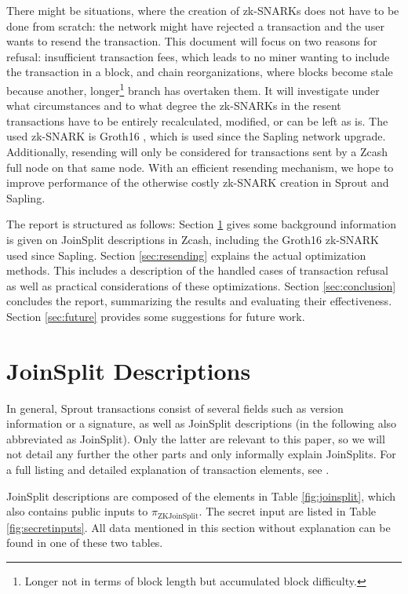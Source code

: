 \documentclass{article}
\begin{document}
There might be situations, where the creation of zk-SNARKs does not have to be done from scratch: the network might have rejected a transaction and the user wants to resend the transaction.
This document will focus on two reasons for refusal: insufficient transaction fees, which leads to no miner wanting to include the transaction in a block, and chain reorganizations, where blocks become stale because another, longer\footnote{Longer not in terms of block length but accumulated block difficulty.} branch has overtaken them.
It will investigate under what circumstances and to what degree the zk-SNARKs in the resent transactions have to be entirely recalculated, modified, or can be left as is.
The used zk-SNARK is Groth16 \cite{groth:zksnark}, which is used since the Sapling network upgrade.
Additionally, resending will only be considered for transactions sent by a Zcash full node on that same node.
With an efficient resending mechanism, we hope to improve performance of the otherwise costly zk-SNARK creation in Sprout and Sapling.

The report is structured as follows: Section \ref{sec:joinsplit} gives some background information is given on JoinSplit descriptions in Zcash, including the Groth16 zk-SNARK used since Sapling.
Section \ref{sec:resending} explains the actual optimization methods.
This includes a description of the handled cases of transaction refusal as well as practical considerations of these optimizations.
Section \ref{sec:conclusion} concludes the report, summarizing the results and evaluating their effectiveness.
Section \ref{sec:future} provides some suggestions for future work.

\section{JoinSplit Descriptions} \label{sec:joinsplit}

In general, Sprout transactions consist of several fields such as version information or a signature, as well as JoinSplit descriptions (in the following also abbreviated as JoinSplit).
Only the latter are relevant to this paper, so we will not detail any further the other parts and only informally explain JoinSplits.
For a full listing and detailed explanation of transaction elements, see \cite{hopwood:zcash}.

JoinSplit descriptions are composed of the elements in Table \ref{fig:joinsplit}, which also contains public inputs to $\pi_\text{ZKJoinSplit}$.
The secret input are listed in Table \ref{fig:secretinputs}.
All data mentioned in this section without explanation can be found in one of these two tables.
\end{document}
